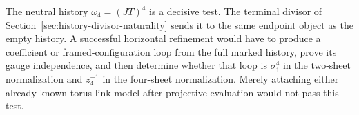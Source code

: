 The neutral history $\omega_4=(JT)^4$ is a decisive test.  The terminal divisor
of Section~\ref{sec:history-divisor-naturality} sends it to the same endpoint
object as the empty history.  A successful horizontal refinement would have to
produce a coefficient or framed-configuration loop from the full marked
history, prove its gauge independence, and then determine whether that loop is
$\sigma_1^4$ in the two-sheet normalization and $z_4^{-1}$ in the four-sheet
normalization.  Merely attaching either already known torus-link model after
projective evaluation would not pass this test.
